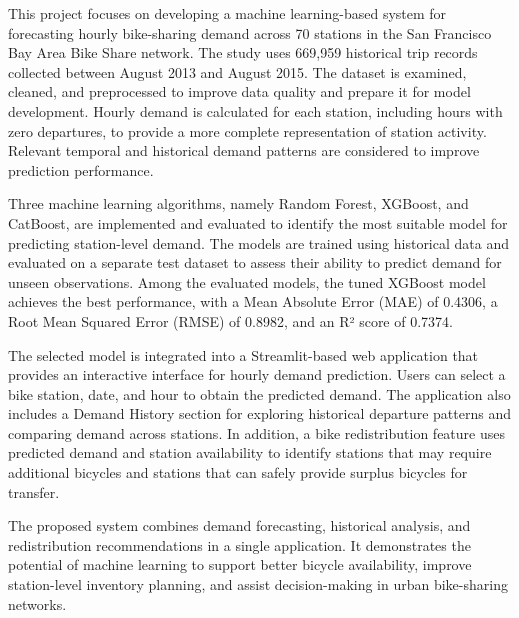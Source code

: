 \documentclass[12pt, a4paper]{article}
\renewcommand{\_}{\textunderscore\allowbreak}
\begin{document}
This project focuses on developing a machine learning-based system for forecasting hourly bike-sharing demand across 70 stations in the San Francisco Bay Area Bike Share network. The study uses 669,959 historical trip records collected between August 2013 and August 2015. The dataset is examined, cleaned, and preprocessed to improve data quality and prepare it for model development. Hourly demand is calculated for each station, including hours with zero departures, to provide a more complete representation of station activity. Relevant temporal and historical demand patterns are considered to improve prediction performance.

Three machine learning algorithms, namely Random Forest, XGBoost, and CatBoost, are implemented and evaluated to identify the most suitable model for predicting station-level demand. The models are trained using historical data and evaluated on a separate test dataset to assess their ability to predict demand for unseen observations. Among the evaluated models, the tuned XGBoost model achieves the best performance, with a Mean Absolute Error (MAE) of 0.4306, a Root Mean Squared Error (RMSE) of 0.8982, and an R² score of 0.7374.

The selected model is integrated into a Streamlit-based web application that provides an interactive interface for hourly demand prediction. Users can select a bike station, date, and hour to obtain the predicted demand. The application also includes a Demand History section for exploring historical departure patterns and comparing demand across stations. In addition, a bike redistribution feature uses predicted demand and station availability to identify stations that may require additional bicycles and stations that can safely provide surplus bicycles for transfer.

The proposed system combines demand forecasting, historical analysis, and redistribution recommendations in a single application. It demonstrates the potential of machine learning to support better bicycle availability, improve station-level inventory planning, and assist decision-making in urban bike-sharing networks.

\newpage

\listoftables
{}

\newpage
\end{document}
